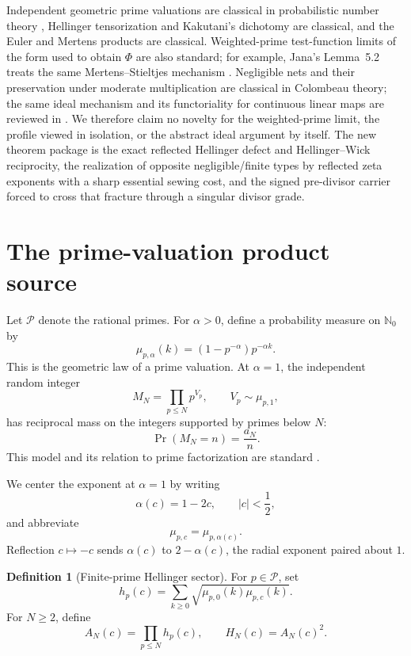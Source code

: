 \documentclass[11pt]{article}
\theoremstyle{definition}
\newtheorem{definition}[theorem]{Definition}
\theoremstyle{remark}
\newcommand{\N}{\mathbb N}
\newcommand{\cP}{\mathcal P}
\begin{document}
Independent geometric prime valuations are classical in probabilistic number theory
\cite{ArratiaBarbourTavare1997,ArratiaBarbourTavare2003}, Hellinger tensorization and Kakutani's
dichotomy are classical, and the Euler and Mertens products are classical.  Weighted-prime
test-function limits of the form used to obtain \(\Phi\) are also standard; for example,
Jana's Lemma~5.2 treats the same Mertens--Stieltjes mechanism
\cite{Jana2021}.  Negligible nets and their preservation under moderate multiplication are
classical in Colombeau theory; the same ideal mechanism and its functoriality for continuous
linear maps are reviewed in \cite{KhelifScarpalezos2021}.  We therefore claim no novelty for
the weighted-prime limit, the profile viewed in isolation, or the abstract ideal argument by
itself.  The new theorem package is the exact reflected Hellinger defect and Hellinger--Wick
reciprocity, the realization of opposite negligible/finite types by reflected zeta exponents
with a sharp essential sewing cost, and the signed pre-divisor carrier forced to cross that
fracture through a singular divisor grade.

\section{The prime-valuation product source}\label{sec:source}

Let \(\cP\) denote the rational primes.  For \(\alpha>0\), define a probability measure on
\(\N_0\) by
\[
 \mu_{p,\alpha}(k)=(1-p^{-\alpha})p^{-\alpha k}.
 \tag{2.1}\label{eq:mu-alpha}
\]
This is the geometric law of a prime valuation.  At \(\alpha=1\), the independent random
integer
\[
 M_N=\prod_{p\leq N}p^{V_p},
 \qquad V_p\sim\mu_{p,1},
 \tag{2.2}\label{eq:random-integer}
\]
has reciprocal mass on the integers supported by primes below \(N\):
\[
 \Pr(M_N=n)=\frac{a_N}{n}.
 \tag{2.3}\label{eq:reciprocal-mass}
\]
This model and its relation to prime factorization are standard
\cite{ArratiaBarbourTavare1997}.

We center the exponent at \(\alpha=1\) by writing
\[
 \alpha(c)=1-2c,\qquad |c|<\frac12,
 \tag{2.4}\label{eq:alpha-c}
\]
and abbreviate
\[
 \mu_{p,c}=\mu_{p,\alpha(c)}.
\]
Reflection \(c\mapsto-c\) sends \(\alpha(c)\) to \(2-\alpha(c)\), the radial exponent paired
about \(1\).

\begin{definition}[Finite-prime Hellinger sector]\label{def:hellinger}
For \(p\in\cP\), set
\[
 h_p(c)=\sum_{k\geq0}\sqrt{\mu_{p,0}(k)\mu_{p,c}(k)}.
 \tag{2.5}\label{eq:local-affinity-definition}
\]
For \(N\geq2\), define
\[
 A_N(c)=\prod_{p\leq N}h_p(c),\qquad H_N(c)=A_N(c)^2.
 \tag{2.6}\label{eq:global-affinity}
\]
\end{definition}
\end{document}
